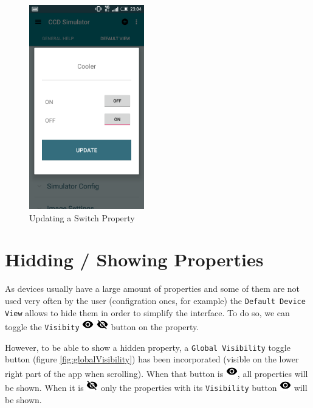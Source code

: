 \begin{figure}
 \centering
 \includegraphics[width=5cm]{../images/updateSwitch2.png}
 \caption{Updating a Switch Property}
 \label{fig:updateSwitch}
\end{figure}
                

   
  

\label{hidding}
\section{Hidding / Showing Properties}

As devices usually have a large amount of properties and some of them are not used very often by the user (configration ones, for example) the \texttt{Default Device View} allows to hide them in order to simplify the interface. To do so, we can toggle the \texttt{Visibity} \includegraphics[width=0.5cm]{../images/visibility1.png} \includegraphics[width=0.5cm]{../images/visibility2.png} button on the property.

However, to be able to show a hidden property, a \texttt{Global Visibility} toggle button (figure \ref{fig:globalVisibility}) has been incorporated (visible on the lower right part of the app when scrolling). When that button is \includegraphics[width=0.5cm]{../images/visibility1.png}, all properties will be shown. When it is \includegraphics[width=0.5cm]{../images/visibility2.png} only the properties with its \texttt{Visibility} button \includegraphics[width=0.5cm]{../images/visibility1.png} will be shown.

